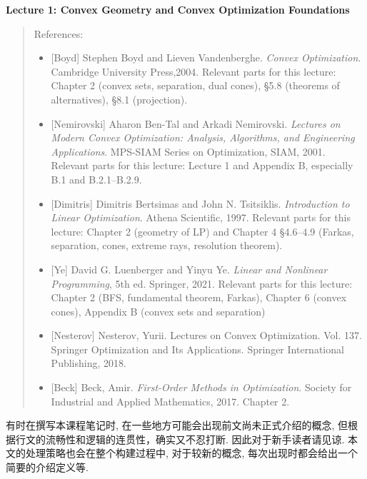 \textbf{Lecture 1: Convex Geometry and Convex Optimization Foundations}

\begin{quote}
References:

\begin{itemize}
\item {}[Boyd] Stephen Boyd and Lieven Vandenberghe. \emph{Convex Optimization}. Cambridge University Press,2004. Relevant parts for this lecture: Chapter 2 (convex sets, separation, dual cones), §5.8 (theorems of alternatives), §8.1 (projection).


\item {}[Nemirovski] Aharon Ben-Tal and Arkadi Nemirovski. \emph{Lectures on Modern Convex Optimization: Analysis, Algorithms, and Engineering Applications}. MPS-SIAM Series on Optimization, SIAM, 2001. Relevant parts for this lecture: Lecture 1 and Appendix B, especially B.1 and B.2.1–B.2.9.


\item {}[Dimitris] Dimitris Bertsimas and John N. Tsitsiklis. \emph{Introduction to Linear Optimization}. Athena Scientific, 1997. Relevant parts for this lecture: Chapter 2 (geometry of LP) and Chapter 4 §4.6–4.9 (Farkas, separation, cones, extreme rays, resolution theorem).


\item {}[Ye] David G. Luenberger and Yinyu Ye. \emph{Linear and Nonlinear Programming}, 5th ed. Springer, 2021. Relevant parts for this lecture: Chapter 2 (BFS, fundamental theorem, Farkas), Chapter 6 (convex cones), Appendix B (convex sets and separation)


\item {}[Nesterov] Nesterov, Yurii. Lectures on Convex Optimization. Vol. 137. Springer Optimization and Its Applications. Springer International Publishing, 2018.


\item {}[Beck] Beck, Amir. \emph{First-Order Methods in Optimization}. Society for Industrial and Applied Mathematics, 2017. Chapter 2.


\end{itemize}

\end{quote}

有时在撰写本课程笔记时, 在一些地方可能会出现前文尚未正式介绍的概念, 但根据行文的流畅性和逻辑的连贯性，确实又不忍打断. 因此对于新手读者请见谅. 本文的处理策略也会在整个构建过程中, 对于较新的概念, 每次出现时都会给出一个简要的介绍定义等.


